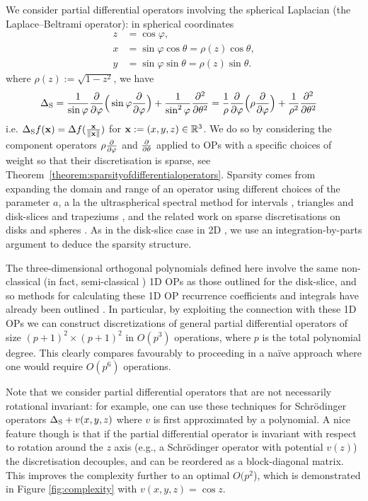 \documentclass[11pt, oneside]{article}   	%
\begin{document}
We consider partial differential operators involving the spherical Laplacian (the Laplace--Beltrami operator): in spherical coordinates 
\begin{align*}
	z &= \cos\varphi, \\
	x &= \sin\varphi \cos\theta = \rho(z) \cos\theta, \\
	y &= \sin\varphi \sin\theta = \rho(z) \sin\theta.
\end{align*}
where $ \rho(z) := \sqrt{1-z^2}$, we have
\begin{align*}
	\Delta_{\rm S} &= {1 \over \sin\varphi} {\partial \over \partial \varphi} \Big( \sin\varphi {\partial \over \partial \varphi} \Big) + {1 \over \sin^2 \varphi} {\partial^2 \over \partial \theta^2} = {1 \over \rho} {\partial \over \partial \varphi} \Big( \rho {\partial \over \partial \varphi} \Big) + {1 \over \rho^2} {\partial^2 \over \partial \theta^2}
\end{align*}
i.e. $\Delta_{\rm S} f(\mathbf{x}) = \Delta f({\mathbf{x} \over \left\| \mathbf{x} \right\|})$ for $\mathbf{x} := (x,y,z) \in \mathbb{R}^3$. We do so by considering the component operators $\rho {\partial \over \partial \varphi}$ and ${\partial \over \partial \theta}$ applied to OPs with a specific choices of weight so that their discretisation is sparse, see Theorem~\ref{theorem:sparsityofdifferentialoperators}.  Sparsity comes from expanding the domain and range of an operator using different choices of the parameter $a$, a la the ultraspherical spectral method for intervals \cite{olver2013fast}, triangles \cite{olver2019triangle} and disk-slices and trapeziums \cite{snowball2019sparse}, and the related work on sparse discretisations on disks \cite{vasil2016tensor} and spheres \cite{vasil2019tensor,lecoanet2019tensor}.  As in the  disk-slice case in 2D \cite{snowball2019sparse}, we use an integration-by-parts argument to deduce the sparsity structure.

 The three-dimensional orthogonal polynomials defined here involve the same non-classical (in fact, semi-classical \cite[\S5]{magnus1995painleve}) 1D OPs as those outlined for the disk-slice, and so methods for calculating these 1D OP recurrence coefficients and integrals have already been outlined \cite{snowball2019sparse}. In particular, by exploiting the connection with these 1D OPs we can construct discretizations of general partial differential operators of size $(p+1)^2 \times (p+1)^2$ in $O(p^3)$ operations, where $p$ is the total polynomial degree. This clearly compares favourably to proceeding in a na\"ive approach where one would require $O(p^6)$ operations.

Note that we consider partial differential operators that are not necessarily rotational invariant:  for example, one can use these techniques for  Schr\"odinger operators $\Delta_{\rm S} + v(x,y,z)$ where $v$ is first approximated by a polynomial. A nice feature though is that if the partial differential operator is invariant with respect to rotation around the $z$ axis (e.g., a Schr\"odinger operator with potential $v(z)$) the discretisation decouples, and can be reordered as a block-diagonal matrix. This improves the complexity further to an optimal $O(p^2$), which is demonstrated in Figure \ref{fig:complexity} with $v(x,y,z) = \cos z$.
\end{document}
